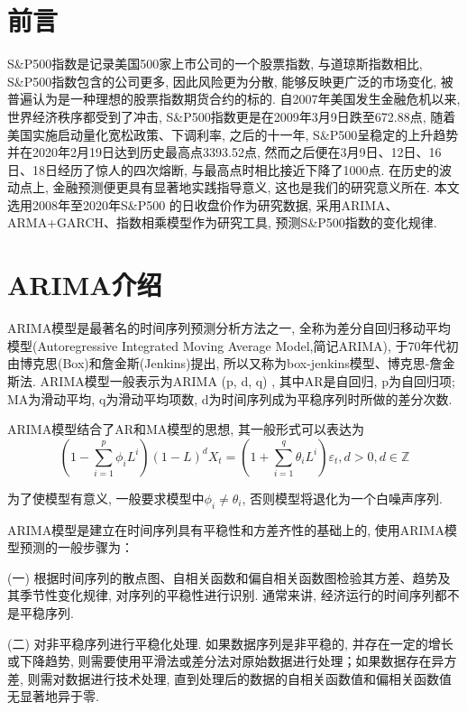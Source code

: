 \documentclass[11pt]{article}
\begin{document}
% 
\tableofcontents


\newpage
\section{前言}
\qquad S\&P500指数是记录美国500家上市公司的一个股票指数, 与道琼斯指数相比, S\&P500指数包含的公司更多, 因此风险更为分散, 能够反映更广泛的市场变化, 被普遍认为是一种理想的股票指数期货合约的标的. 自2007年美国发生金融危机以来, 世界经济秩序都受到了冲击, S\&P500指数更是在2009年3月9日跌至672.88点, 随着美国实施启动量化宽松政策、下调利率, 之后的十一年, S\&P500呈稳定的上升趋势并在2020年2月19日达到历史最高点3393.52点, 然而之后便在3月9日、12日、16日、18日经历了惊人的四次熔断, 与最高点时相比接近下降了1000点. 在历史的波动点上, 金融预测便更具有显著地实践指导意义, 这也是我们的研究意义所在. 本文选用2008年至2020年S\&P500 的日收盘价作为研究数据, 采用ARIMA、ARMA+GARCH、指数相乘模型作为研究工具, 预测S\&P500指数的变化规律. 

\section{ARIMA介绍}

\qquad ARIMA模型是最著名的时间序列预测分析方法之一, 全称为差分自回归移动平均模型(Autoregressive Integrated Moving Average Model,简记ARIMA), 于70年代初由博克思(Box)和詹金斯(Jenkins)提出, 所以又称为box-jenkins模型、博克思-詹金斯法. ARIMA模型一般表示为ARIMA (p, d, q) , 其中AR是自回归, p为自回归项; MA为滑动平均, q为滑动平均项数, d为时间序列成为平稳序列时所做的差分次数. 

\qquad ARIMA模型结合了AR和MA模型的思想, 其一般形式可以表达为
\[
(1-\sum_{i=1}^p \phi_i L^i)(1-L)^d X_t = (1+\sum_{i=1}^q \theta_i L^i)\varepsilon_t,d>0,d \in \mathbb{Z}
\]

为了使模型有意义, 一般要求模型中$\phi_i \ne \theta_i$, 否则模型将退化为一个白噪声序列. 

\qquad ARIMA模型是建立在时间序列具有平稳性和方差齐性的基础上的, 使用ARIMA模型预测的一般步骤为：

\qquad  (一) 根据时间序列的散点图、自相关函数和偏自相关函数图检验其方差、趋势及其季节性变化规律, 对序列的平稳性进行识别. 通常来讲,  经济运行的时间序列都不是平稳序列. 

\qquad  (二) 对非平稳序列进行平稳化处理. 如果数据序列是非平稳的, 并存在一定的增长或下降趋势, 则需要使用平滑法或差分法对原始数据进行处理；如果数据存在异方差, 则需对数据进行技术处理, 直到处理后的数据的自相关函数值和偏相关函数值无显著地异于零. 
\end{document}
